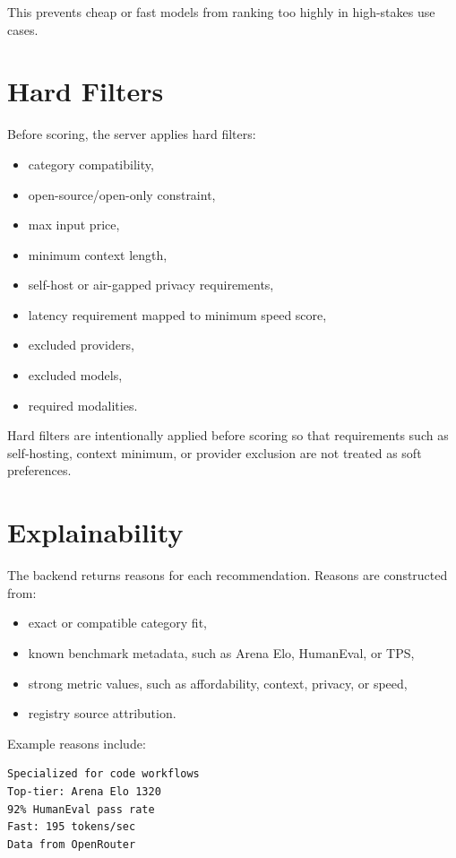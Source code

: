 \documentclass[11pt]{article}
\begin{document}
This prevents cheap or fast models from ranking too highly in high-stakes use cases.

\section{Hard Filters}

Before scoring, the server applies hard filters:

\begin{itemize}[leftmargin=*]
  \item category compatibility,
  \item open-source/open-only constraint,
  \item max input price,
  \item minimum context length,
  \item self-host or air-gapped privacy requirements,
  \item latency requirement mapped to minimum speed score,
  \item excluded providers,
  \item excluded models,
  \item required modalities.
\end{itemize}

Hard filters are intentionally applied before scoring so that requirements such as self-hosting, context minimum, or provider exclusion are not treated as soft preferences.

\section{Explainability}

The backend returns reasons for each recommendation. Reasons are constructed from:

\begin{itemize}[leftmargin=*]
  \item exact or compatible category fit,
  \item known benchmark metadata, such as Arena Elo, HumanEval, or TPS,
  \item strong metric values, such as affordability, context, privacy, or speed,
  \item registry source attribution.
\end{itemize}

Example reasons include:

\begin{lstlisting}[style=code]
Specialized for code workflows
Top-tier: Arena Elo 1320
92% HumanEval pass rate
Fast: 195 tokens/sec
Data from OpenRouter
\end{lstlisting}
\end{document}

